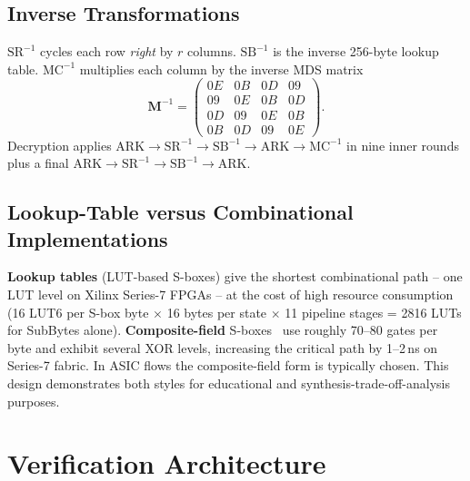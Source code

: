 \documentclass[conference,10pt,a4paper]{IEEEtran}
\begin{document}
\subsection{Inverse Transformations}
$\mathrm{SR}^{-1}$ cycles each row \emph{right} by $r$ columns.
$\mathrm{SB}^{-1}$ is the inverse 256-byte lookup table.
$\mathrm{MC}^{-1}$ multiplies each column by the inverse MDS matrix
\[
\mathbf{M}^{-1} = \begin{pmatrix}
0E & 0B & 0D & 09 \\
09 & 0E & 0B & 0D \\
0D & 09 & 0E & 0B \\
0B & 0D & 09 & 0E
\end{pmatrix}.
\]
Decryption applies $\mathrm{ARK} \to\mathrm{SR}^{-1} \to\mathrm{SB}^{-1}
\to\mathrm{ARK} \to\mathrm{MC}^{-1}$ in nine inner rounds plus a final
$\mathrm{ARK} \to\mathrm{SR}^{-1} \to\mathrm{SB}^{-1} \to\mathrm{ARK}$.

\subsection{Lookup-Table versus Combinational Implementations}
\textbf{Lookup tables} (LUT-based S-boxes) give the shortest combinational
path -- one LUT level on Xilinx Series-7 FPGAs -- at the cost of high
resource consumption (16 LUT6 per S-box byte $\times$ 16 bytes per state
$\times$ 11 pipeline stages = 2816 LUTs for SubBytes alone).
\textbf{Composite-field} S-boxes~\cite{satoh,bertoni} use roughly 70--80
gates per byte and exhibit several XOR levels, increasing the critical
path by 1--2\,ns on Series-7 fabric.  In ASIC flows the composite-field
form is typically chosen.  This design demonstrates both styles for
educational and synthesis-trade-off-analysis purposes.
\section{Verification Architecture}
\label{sec:verifarch}
\end{document}
